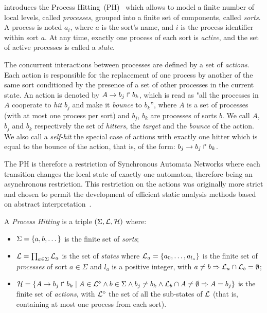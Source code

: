  introduces the Process Hitting~(PH)~\cite{PMR10-TCSB}
which allows to model a finite number of local levels,
called \emph{processes},
grouped into a finite set of components, called \emph{sorts}.
A process is noted $a_i$, where $a$ is the sort's name,
and $i$ is the process identifier within sort $a$.
At any time, exactly one process of each sort is \emph{active},
and the set of active processes is called a \emph{state}.

The concurrent interactions between processes are defined by a set of \emph{actions}.
Each action is responsible for the replacement of one process by another of the same sort
conditioned by the presence of a set of other processes in the current state.
An action is denoted by $A\rightarrow b_j\Rsh b_k$, which is read as "all the processes in $A$ cooperate to \emph{hit} $b_j$ and make it \emph{bounce} to $b_k$'',
where $A$ is a set of processes (with at most one process per sort) and
$b_j$, $b_k$ are processes of sorts $b$.
We call $A$, $b_j$ and $b_k$ respectively the set of \emph{hitters}, the \emph{target} and the \emph{bounce} of the action.
We also call a \emph{self-hit} the special case of actions with exactly one hitter which is equal to the bounce of the action, that is, of the form:
$b_j\rightarrow b_j\Rsh b_k$.

The PH is therefore a restriction of Synchronous Automata Networks where each transition
changes the local state of exactly one automaton,
therefore being an asynchronous restriction.
This restriction on the actions was originally more strict and chosen to permit
the development of efficient static analysis methods
based on abstract interpretation~\cite{PMR12-MSCS}.

\begin{definition}\label{def:PH}
  A \emph{Process Hitting} is a triple $(\Sigma,\mathcal{L},\mathcal{H})$ where:
  \begin{itemize}
    \item  $\Sigma = \{a,b,\dots\}$ is the finite set of \emph{sorts};
    \item  $\mathcal{L} = \prod_{a\in\Sigma} \mathcal{L}_a$ is the set of \emph{states} where
      $\mathcal{L}_a = \{a_0,\dots,a_{l_a}\}$
      is the finite set of \emph{processes} of sort $a\in\Sigma$
      and $l_a$ is a positive integer, with $a\neq b\Rightarrow \mathcal{L}_a \cap \mathcal{L}_b = \emptyset$;
    \item $\mathcal{H} = \{ A\rightarrow b_j\Rsh b_k \mid A \in \mathcal{L}^{\diamond} \wedge b \in \Sigma \wedge b_j \neq b_k \wedge \mathcal{L}_b \cap A \neq \emptyset \Rightarrow A=b_j\}$ is the finite set of \emph{actions},
    with $\mathcal{L}^{\diamond}$ the set of all the sub-states of $\mathcal{L}$
    (that is, containing at most one process from each sort).
  \end{itemize}
\end{definition}

